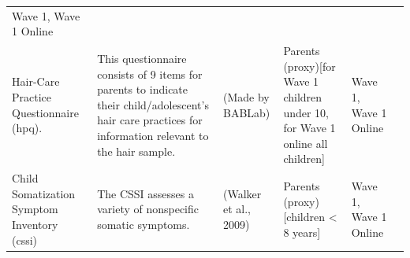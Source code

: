 \documentclass[]{book}
\begin{document}
\begin{longtable}[]{@{}llllll@{}}
\begin{minipage}[t]{0.06\columnwidth}
Wave 1, Wave 1 Online\strut
\end{minipage} & \begin{minipage}[t]{0.10\columnwidth}\raggedright
\strut
\end{minipage}\tabularnewline
\begin{minipage}[t]{0.18\columnwidth}\raggedright
Hair-Care Practice Questionnaire (hpq).\strut
\end{minipage} & \begin{minipage}[t]{0.18\columnwidth}\raggedright
This questionnaire consists of 9 items for parents to indicate their child/adolescent's hair care practices for information relevant to the hair sample.\strut
\end{minipage} & \begin{minipage}[t]{0.15\columnwidth}\raggedright
(Made by BABLab)\strut
\end{minipage} & \begin{minipage}[t]{0.16\columnwidth}\raggedright
Parents (proxy){[}for Wave 1 children under 10, for Wave 1 online all children{]}\strut
\end{minipage} & \begin{minipage}[t]{0.06\columnwidth}\raggedright
Wave 1, Wave 1 Online\strut
\end{minipage} & \begin{minipage}[t]{0.10\columnwidth}\raggedright
\strut
\end{minipage}\tabularnewline
\begin{minipage}[t]{0.18\columnwidth}\raggedright
Child Somatization Symptom Inventory (cssi)\strut
\end{minipage} & \begin{minipage}[t]{0.18\columnwidth}\raggedright
The CSSI assesses a variety of nonspecific somatic symptoms.\strut
\end{minipage} & \begin{minipage}[t]{0.15\columnwidth}\raggedright
(Walker et al., 2009)\strut
\end{minipage} & \begin{minipage}[t]{0.16\columnwidth}\raggedright
Parents (proxy){[}children \textless{} 8 years{]}\strut
\end{minipage} & \begin{minipage}[t]{0.06\columnwidth}\raggedright
Wave 1, Wave 1 Online\strut
\end{minipage} & \begin{minipage}[t]{0.10\columnwidth}\raggedright
\strut
\end{minipage}\tabularnewline

\end{longtable}
\end{document}
